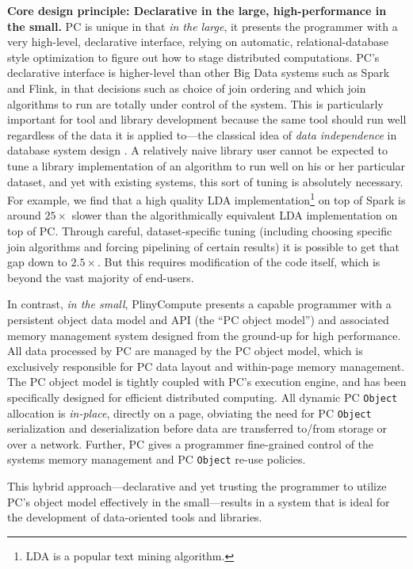 \vspace{5 pt}
\noindent
\textbf{Core design principle: Declarative in the large, high-performance in the small.}
PC is unique in that \emph{in the large}, 
it presents the programmer with a very high-level,
declarative interface, relying on automatic, 
relational-database style optimization \cite{chaudhuri1998overview} to figure out how to stage
distributed computations.  
PC's declarative interface is higher-level than other Big Data systems
such as Spark and Flink, in that decisions such as choice of join ordering and which
join algorithms to run are
totally under control of the system. 
This is particularly important for tool and library development because the same tool should run well regardless of the data
it is applied to---the classical idea of \emph{data independence} in database system design \cite{stonebraker1990third}.
A relatively naive library user cannot be expected to tune a library implementation of an algorithm to run
well on his or her particular dataset, and yet with existing systems, this sort of tuning
is absolutely necessary.  For example, we find
that a high quality LDA implementation\footnote{LDA \cite{blei2003latent} is a popular text mining algorithm.}
on top of Spark is around $25\times$ slower than the algorithmically equivalent LDA
implementation on top of PC.  Through careful, dataset-specific tuning (including choosing specific join algorithms and
forcing pipelining of certain results) it is possible to get that gap down to $2.5\times$.  But this requires modification of the
code itself, which is beyond the vast majority of end-users.

In contrast, \emph{in the small}, PlinyCompute presents a capable programmer with a
persistent object data model and API (the ``PC object model'') and associated memory management system
designed from the ground-up for
high performance.
All data processed by PC are managed by
the PC object
model, which is exclusively responsible for PC data layout and within-page memory management.  
The PC object model is tightly coupled with
PC's execution engine, and has been specifically designed for
efficient distributed computing.  
All dynamic PC \texttt{Object} allocation is \emph{in-place}, directly on a page, obviating
the need for PC \texttt{Object} serialization and deserialization before data are transferred to/from storage or over a network.
Further, PC gives a programmer fine-grained control of the systems
memory management and PC \texttt{Object} re-use policies.

This hybrid approach---declarative and yet trusting the programmer
to utilize PC's object model effectively
in the small---results in a system that is ideal for the 
development of data-oriented tools and libraries.


